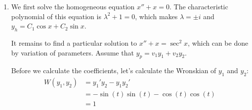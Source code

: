 \documentclass[12pt]{article}
\begin{document}
\begin{enumerate}
    \item We first solve the homogeneous equation $x''+x=0$.
          The characteristic polynomial of this equation is $\lambda^2+1=0$, which makes $\lambda=\pm i$
          and $y_h=C_1 \cos x + C_2 \sin x$.

          It remains to find a particular solution to $x''+x  =\sec^2 x$, which can be done by variation of parameters.
          Assume that $y_p=v_1y_1+v_2y_2$.

          Before we calculate the coefficients, let's calculate the Wronskian of $y_1$ and $y_2$:
          \begin{align*}
              W(y_1, y_2) & = y_1'y_2 - y_1y_2'                \\
                          & = -\sin(t)\sin(t) - \cos(t)\cos(t) \\
                          & = 1
          \end{align*}


\end{enumerate}
\end{document}
